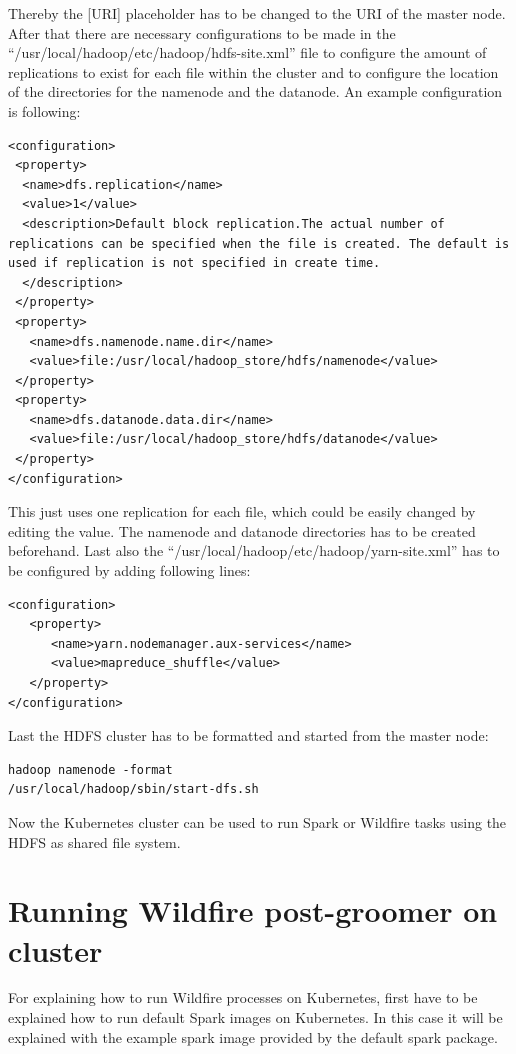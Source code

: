 Thereby the [URI] placeholder has to be changed to the URI of the master node. After that there are necessary configurations to be made in the ``/usr/local/hadoop/etc/hadoop/hdfs-site.xml'' file to configure the amount of replications to exist for each file within the cluster and to configure the location of the directories for the namenode and the datanode. An example configuration is following:
\begin{lstlisting}[caption={Configurations hdfs-site.xml},captionpos=b]
<configuration>
 <property>
  <name>dfs.replication</name>
  <value>1</value>
  <description>Default block replication.The actual number of replications can be specified when the file is created. The default is used if replication is not specified in create time.
  </description>
 </property>
 <property>
   <name>dfs.namenode.name.dir</name>
   <value>file:/usr/local/hadoop_store/hdfs/namenode</value>
 </property>
 <property>
   <name>dfs.datanode.data.dir</name>
   <value>file:/usr/local/hadoop_store/hdfs/datanode</value>
 </property>
</configuration>
\end{lstlisting}
This just uses one replication for each file, which could be easily changed by editing the value. The namenode and datanode directories has to be created beforehand. Last also the ``/usr/local/hadoop/etc/hadoop/yarn-site.xml'' has to be configured by adding following lines:
\begin{lstlisting}[caption={Configurations yarn-site.xml},captionpos=b]
<configuration>
   <property>
      <name>yarn.nodemanager.aux-services</name>
      <value>mapreduce_shuffle</value>
   </property>
</configuration>
\end{lstlisting}

Last the HDFS cluster has to be formatted and started from the master node:
\begin{lstlisting}[caption={Start hadoop cluster},captionpos=b]
hadoop namenode -format
/usr/local/hadoop/sbin/start-dfs.sh
\end{lstlisting}

Now the Kubernetes cluster can be used to run Spark or Wildfire tasks using the HDFS as shared file system.

\section{Running Wildfire post-groomer on cluster}

For explaining how to run Wildfire processes on Kubernetes, first have to be explained how to run default Spark images on Kubernetes. In this case it will be explained with the example spark image provided by the default spark package.

